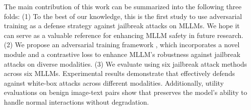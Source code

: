 
The main contribution of this work can be summarized into the following three folds: (1) To the best of our knowledge, this is the first study to use adversarial training as a defense strategy against jailbreak attacks on MLLMs. We hope it can serve as a valuable reference for enhancing MLLM safety in future research. (2) We propose an adversarial training framework {\name}, which incorporates a novel {\attack} module and a contrastive loss to enhance MLLM's robustness against jailbreak attacks on diverse modalities. (3) We evaluate {\name} using six jailbreak attack methods across six MLLMs. Experimental results demonstrate that {\name} effectively defends against white-box attacks across different modalities. Additionally, utility evaluations on benign image-text pairs show that {\name} preserves the model's ability to handle normal interactions without degradation. 






